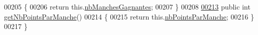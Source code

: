 \begin{DoxyCode}
00205     \{
00206         \textcolor{keywordflow}{return} this.\hyperlink{classcom_1_1example_1_1area_1_1_rencontre_aef266bd256aecd70fbd02cf07625ed14}{nbManchesGagnantes};
00207     \}
00208 
\hyperlink{classcom_1_1example_1_1area_1_1_rencontre_a539e26b8c59998880fcf9b7c9f2b685a}{00213}     \textcolor{keyword}{public} \textcolor{keywordtype}{int} \hyperlink{classcom_1_1example_1_1area_1_1_rencontre_a539e26b8c59998880fcf9b7c9f2b685a}{getNbPointsParManche}()
00214     \{
00215         \textcolor{keywordflow}{return} this.\hyperlink{classcom_1_1example_1_1area_1_1_rencontre_ae1849c4bcdcfbb2d336b750a36be1162}{nbPointsParManche};
00216     \}
00217 \}
\end{DoxyCode}
